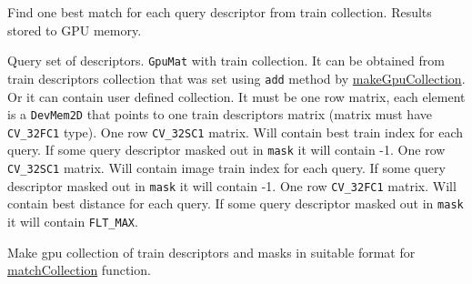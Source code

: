 \label{cppfunc.gpu.BruteForceMatcher.matchCollection}
Find one best match for each query descriptor from train collection. Results stored to GPU memory.
\begin{description}
 {Query set of descriptors.}
 {\texttt{GpuMat} with train collection. It can be obtained from train descriptors collection that was set using \texttt{add} method by \hyperref[cppfunc.gpu.BruteForceMatcher.makeGpuCollection]{makeGpuCollection}. Or it can contain user defined collection. It must be one row matrix, each element is a \texttt{DevMem2D} that points to one train descriptors matrix (matrix must have \texttt{CV\_32FC1} type).}
 {One row \texttt{CV\_32SC1} matrix. Will contain best train index for each query. If some query descriptor masked out in \texttt{mask} it will contain -1.}
 {One row \texttt{CV\_32SC1} matrix. Will contain image train index for each query. If some query descriptor masked out in \texttt{mask} it will contain -1.}
 {One row \texttt{CV\_32FC1} matrix. Will contain best distance for each query. If some query descriptor masked out in \texttt{mask} it will contain \texttt{FLT\_MAX}.}
\end{description}

\label{cppfunc.gpu.BruteForceMatcher.makeGpuCollection}
Make gpu collection of train descriptors and masks in suitable format for \hyperref[cppfunc.gpu.BruteForceMatcher.matchCollection]{matchCollection} function.

